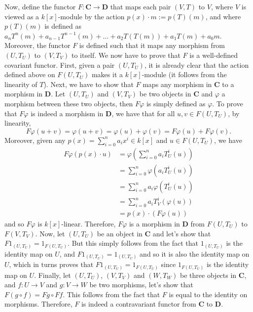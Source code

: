 \documentclass{article}
\newcommand{\CatC}{\textbf{C}}
\newcommand{\CatD}{\textbf{D}}
\begin{document}
Now, define the functor $F : \CatC \to \CatD$ that maps each pair $(V,T)$ to $V$, where $V$ is viewed as a $k[x]$-module by the action $p(x) \cdot m := p(T)(m)$, and where $p(T)(m)$ is defined as $a_nT^n(m) + a_{n-1}T^{n-1}(m) + \dots + a_2 T(T(m)) + a_1T(m) + a_0m$. Moreover, the functor $F$ is defined such that it maps any morphism from $(U,T_U)$ to $(V,T_V)$ to itself. We now have to prove that $F$ is a well-defined covariant functor. First, given a pair $(U, T_U)$, it is already clear that the action defined above on $F(U, T_U)$ makes it a $k[x]$-module (it follows from the linearity of $T$). Next, we have to show that $F$ maps any morphism in $\CatC$ to a morphism in $\CatD$. Let $(U, T_U)$ and $(V, T_V)$ be two objects in $\CatC$ and $\varphi$ a morphism between these two objects, then $F\varphi$ is simply defined as $\varphi$. To prove that $F\varphi$ is indeed a morphism in $\CatD$, we have that for all $u,v \in F(U, T_U)$, by linearity,
$$F\varphi(u + v) = \varphi(u+v) = \varphi(u) + \varphi(v) = F\varphi(u) + F\varphi(v).$$
Moreover, given any $p(x) = \sum_{i=0}^{n}a_ix^i \in k[x]$ and $u \in F(U, T_U)$, we have
\begin{align*}
    F\varphi(p(x) \cdot u) &= \varphi\left(\sum_{i=0}^{n}a_i T_U^i(u)\right) \\
    &= \sum_{i=0}^{n}\varphi(a_i T_U^i(u)) \\
    &= \sum_{i=0}^{n}a_i\varphi(T_U^i(u)) \\
    &= \sum_{i=0}^{n}a_iT_V^i(\varphi(u)) \\
    &= p(x) \cdot (F\varphi(u))
\end{align*}
and so $F\varphi$ is $k[x]$-linear. Therefore, $F\varphi$ is a morphism in $\CatD$ from $F(U, T_U)$ to $F(V,T_V)$. Now, let $(U,T_U)$ be an object in $\CatC$ and let's show that $F1_{(U,T_U)} = 1_{F(U,T_U)}$. But this simply follows from the fact that $1_{(U,T_U)}$ is the identity map on $U$, and $F1_{(U,T_U)} = 1_{(U,T_U)}$ and so it is also the identity map on $U$, which in turns proves that $F1_{(U,T_U)} = 1_{F(U,T_U)}$ since $1_{F(U,T_U)}$ is the identity map on $U$. Finally, let $(U,T_U)$, $(V,T_V)$ and $(W,T_W)$ be three objects in \CatC, and $f : U \to V$ and $g : V \to W$ be two morphisms, let's show that $F(g \circ f) = Fg \circ Ff$. This follows from the fact that $F$ is equal to the identity on morphisms. Therefore, $F$ is indeed a contravariant functor from $\CatC$ to \CatD.
\end{document}
